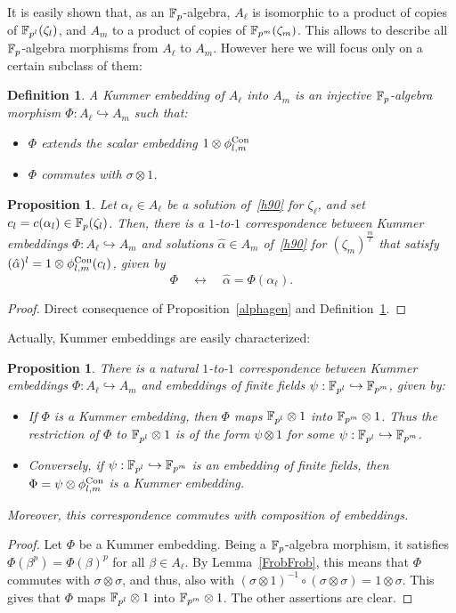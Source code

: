 \documentclass{sig-alternate}
\newtheorem{proposition}[theorem]{Proposition}
\newtheorem{definition}[theorem]{Definition}
\begin{document}
It is easily shown that, as an $\mathbb{F}_{p}$-algebra, $A_\ell$ is isomorphic to a product of copies of $\mathbb{F}_{p^l}(\zeta_l)$,
and $A_m$ to a product of copies of $\mathbb{F}_{p^m}(\zeta_m)$.
This allows to describe all $\mathbb{F}_{p}$-algebra morphisms from $A_\ell$ to $A_m$. However here we will focus only on a certain
subclass of them:
\begin{definition}
\label{Kembedding}
A \emph{Kummer embedding} of $A_\ell$ into $A_m$ is an \emph{injective} $\mathbb{F}_{p}$-algebra morphism $\Phi:A_\ell\hookrightarrow A_m$
such that:
\begin{itemize}
\item $\Phi$ extends the scalar embedding $1\otimes{\phi^{\textrm{Con}}_{{l},{m}}}$
\item $\Phi$ commutes with $\sigma\otimes1$.
\end{itemize}
\end{definition}

\begin{proposition}
\label{Phialpha}
Let $\alpha_\ell\in A_\ell$ be a solution of~\eqref{h90} for $\zeta_\ell$, and set $c_l=c(\alpha_l)\in\mathbb{F}_{p}(\zeta_l)$.
Then, there is a $1$-to-$1$ correspondence between Kummer embeddings $\Phi:A_\ell\hookrightarrow A_m$ and solutions $\hat{\alpha}\in A_m$
of~\eqref{h90} for $(\zeta_m)^{\frac{m}{\ell}}$ that satisfy $(\hat{\alpha})^l=1\otimes{\phi^{\textrm{Con}}_{{l},{m}}}(c_l)$,
given by \[ \Phi\quad\longleftrightarrow\quad\hat{\alpha}=\Phi(\alpha_\ell). \]
\end{proposition}
\begin{proof}
Direct consequence of Proposition~\ref{alphagen} and Definition~\ref{Kembedding}.
\end{proof}

Actually, Kummer embeddings are easily characterized:
\begin{proposition}
\label{Phipsi}
There is a natural $1$-to-$1$ correspondence between Kummer embeddings $\Phi:A_\ell\hookrightarrow A_m$
and embeddings of finite fields $\psi:\mathbb{F}_{p^l}\hookrightarrow\mathbb{F}_{p^m}$, given by:
\begin{itemize}
\item If $\Phi$ is a Kummer embedding, then $\Phi$ maps $\mathbb{F}_{p^l}\otimes1$ into $\mathbb{F}_{p^m}\otimes 1$.
Thus the restriction of $\Phi$ to $\mathbb{F}_{p^l}\otimes1$ is of the form $\psi\otimes1$ for some $\psi:\mathbb{F}_{p^l}\hookrightarrow\mathbb{F}_{p^m}$.
\item Conversely, if $\psi:\mathbb{F}_{p^l}\hookrightarrow\mathbb{F}_{p^m}$ is an embedding of finite fields, then $\Phi=\psi\otimes{\phi^{\textrm{Con}}_{{l},{m}}}$
is a Kummer embedding.
\end{itemize}
Moreover, this correspondence commutes with composition of embeddings.
\end{proposition}
\begin{proof}
Let $\Phi$ be a Kummer embedding. Being a $\mathbb{F}_{p}$-algebra morphism, it satisfies $\Phi(\beta^p)=\Phi(\beta)^p$ for all $\beta\in A_\ell$.
By Lemma~\ref{FrobFrob}, this means that $\Phi$ commutes with $\sigma\otimes\sigma$, and thus,
also with $(\sigma\otimes 1)^{-1}\circ(\sigma\otimes\sigma)=1\otimes\sigma$.
This gives that $\Phi$ maps $\mathbb{F}_{p^l}\otimes1$ into $\mathbb{F}_{p^m}\otimes 1$.
The other assertions are clear.
\end{proof}
\end{document}
